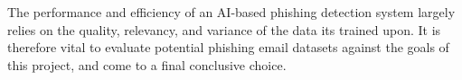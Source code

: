 
The performance and efficiency of an AI-based phishing detection system largely relies on the quality, relevancy, and variance of the data its trained upon. It is therefore vital to evaluate potential phishing email datasets against the goals of this project, and come to a final conclusive choice.

